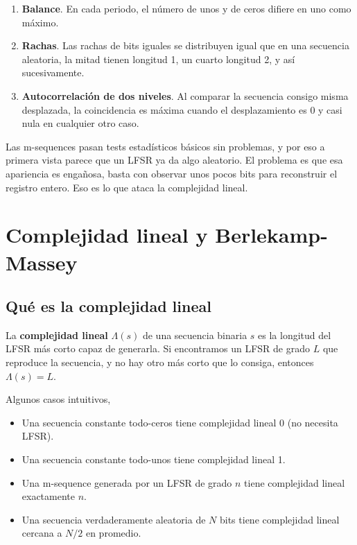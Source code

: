 \begin{enumerate}
  \item \textbf{Balance}. En cada periodo, el número de unos y de ceros difiere en uno como máximo.
  \item \textbf{Rachas}. Las rachas de bits iguales se distribuyen igual que en una secuencia aleatoria,
        la mitad tienen longitud 1, un cuarto longitud 2, y así sucesivamente.
  \item \textbf{Autocorrelación de dos niveles}. Al comparar la secuencia consigo misma desplazada,
        la coincidencia es máxima cuando el desplazamiento es 0 y casi nula en cualquier otro caso.
\end{enumerate}

Las m-sequences pasan tests estadísticos básicos sin problemas, y por eso a primera vista parece que un LFSR ya da algo aleatorio.
El problema es que esa apariencia es engañosa, basta con observar unos pocos bits para reconstruir el registro entero.
Eso es lo que ataca la complejidad lineal.

\section{Complejidad lineal y Berlekamp-Massey}

\subsection{Qué es la complejidad lineal}

La \textbf{complejidad lineal} $\Lambda(s)$ de una secuencia binaria $s$ es la longitud del LFSR más corto capaz de generarla.
Si encontramos un LFSR de grado $L$ que reproduce la secuencia, y no hay otro más corto que lo consiga, entonces $\Lambda(s) = L$.

Algunos casos intuitivos,

\begin{itemize}
  \item Una secuencia constante todo-ceros tiene complejidad lineal 0 (no necesita LFSR).
  \item Una secuencia constante todo-unos tiene complejidad lineal 1.
  \item Una m-sequence generada por un LFSR de grado $n$ tiene complejidad lineal exactamente $n$.
  \item Una secuencia verdaderamente aleatoria de $N$ bits tiene complejidad lineal cercana a $N/2$ en promedio.
\end{itemize}

